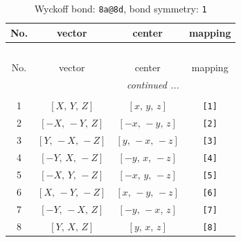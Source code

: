 \documentclass[fleqn,8pt]{jsarticle}
\begin{document}
\begin{longtable}{cccc}
\caption{Wyckoff bond: {\tt 8a@8d}, bond symmetry: {\tt 1}}
 \\
 \hline \hline
No. & vector & center & mapping \\ \hline \endfirsthead

\multicolumn{3}{l}{\tablename\ \thetable{}} \\
 \hline \hline
No. & vector & center & mapping \\ \hline \endhead

 \hline \hline
\multicolumn{3}{r}{\footnotesize\it continued ...} \\ \endfoot

 \hline \hline
\multicolumn{3}{r}{} \\ \endlastfoot

1 & $\left[ X,\, Y,\, Z \right]$ & $\left[ x,\, y,\, z \right]$ & {\tt [1]} \\ \hline
2 & $\left[ - X,\, - Y,\, Z \right]$ & $\left[ - x,\, - y,\, z \right]$ & {\tt [2]} \\ \hline
3 & $\left[ Y,\, - X,\, - Z \right]$ & $\left[ y,\, - x,\, - z \right]$ & {\tt [3]} \\ \hline
4 & $\left[ - Y,\, X,\, - Z \right]$ & $\left[ - y,\, x,\, - z \right]$ & {\tt [4]} \\ \hline
5 & $\left[ - X,\, Y,\, - Z \right]$ & $\left[ - x,\, y,\, - z \right]$ & {\tt [5]} \\ \hline
6 & $\left[ X,\, - Y,\, - Z \right]$ & $\left[ x,\, - y,\, - z \right]$ & {\tt [6]} \\ \hline
7 & $\left[ - Y,\, - X,\, Z \right]$ & $\left[ - y,\, - x,\, z \right]$ & {\tt [7]} \\ \hline
8 & $\left[ Y,\, X,\, Z \right]$ & $\left[ y,\, x,\, z \right]$ & {\tt [8]} \\
\end{longtable}
\end{document}
